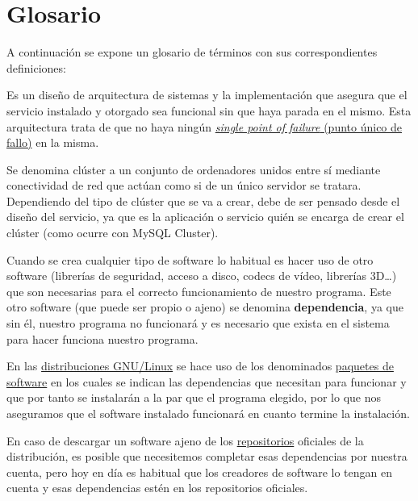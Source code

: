 \chapter{Glosario}

A continuación se expone un glosario de términos con sus correspondientes definiciones:

\begin{description}
    \hypertarget{altadisponibilidad}{}
    \item[Alta Disponibilidad:] Es un diseño de arquitectura de sistemas y la implementación que asegura que el servicio instalado y otorgado sea funcional sin que haya parada en el mismo. Esta arquitectura trata de que no haya ningún \hyperlink{spf}{\textit{single point of failure} (punto único de fallo)} en la misma.

    \hypertarget{cluster}{}
    \item[Clúster:] Se denomina clúster a un conjunto de ordenadores unidos entre sí mediante conectividad de red que actúan como si de un único servidor se tratara. Dependiendo del tipo de clúster que se va a crear, debe de ser pensado desde el diseño del servicio, ya que es la aplicación o servicio quién se encarga de crear el clúster (como ocurre con MySQL Cluster).

    \hypertarget{dependencia_software}{}
    \item [Dependencia de software:] Cuando se crea cualquier tipo de software lo habitual es hacer uso de otro software (librerías de seguridad, acceso a disco, codecs de vídeo, librerías 3D…) que son necesarias para el correcto funcionamiento de nuestro programa. Este otro software (que puede ser propio o ajeno) se denomina \textbf{dependencia}, ya que sin él, nuestro programa no funcionará y es necesario que exista en el sistema para hacer funciona nuestro programa.

    En las \hyperlink{distribucion_gnu_linux}{distribuciones GNU/Linux} se hace uso de los denominados \hyperlink{paquete_de_software}{paquetes de software} en los cuales se indican las dependencias que necesitan para funcionar y que por tanto se instalarán a la par que el programa elegido, por lo que nos aseguramos que el software instalado funcionará en cuanto termine la instalación.

    En caso de descargar un software ajeno de los \hyperlink{repositorio_de_software}{repositorios} oficiales de la distribución, es posible que necesitemos completar esas dependencias por nuestra cuenta, pero hoy en día es habitual que los creadores de software lo tengan en cuenta y esas dependencias estén en los repositorios oficiales.


\end{description}
